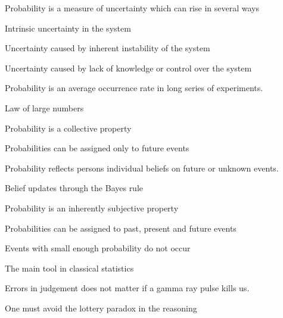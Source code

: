 \documentclass[landscape,footrule]{foils}
\begin{document}
Probability is a measure of uncertainty which can rise in several ways
\begin{triangles}
\item Intrinsic uncertainty in the system 
\item Uncertainty caused by inherent instability of the system
\item Uncertainty caused by lack of knowledge or control over the system
\end{triangles}




Probability is an average occurrence rate in long series of experiments.

\begin{triangles}
\item Law of large numbers
\item Probability is a collective property 
\item Probabilities can be assigned only to future events
\end{triangles}





Probability reflects persons individual beliefs on future or unknown events. 

\begin{triangles}
\item Belief updates through the Bayes rule
\item Probability is an inherently subjective property 
\item Probabilities can be assigned  to past, present and future events
\end{triangles}





Events with small enough probability do not occur
\begin{triangles}
\item The main tool in classical statistics 
\item Errors in judgement does not matter if a gamma ray pulse kills us.
\item One must avoid the lottery paradox in the reasoning
\end{triangles}
\end{document}
